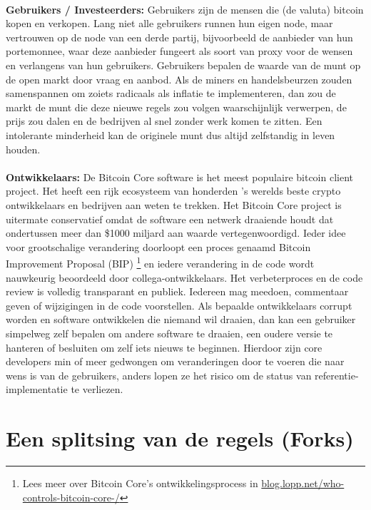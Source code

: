 \paragraph{}
\noindent\textbf{Gebruikers / Investeerders:} 
Gebruikers zijn de mensen die (de valuta) bitcoin kopen en verkopen. Lang niet alle gebruikers runnen hun eigen node, maar vertrouwen op de node van een derde partij, bijvoorbeeld de aanbieder van hun portemonnee, waar deze aanbieder fungeert als soort van proxy voor de wensen en verlangens van hun gebruikers. Gebruikers bepalen de waarde van de munt op de open markt door vraag en aanbod. Als de miners en handelsbeurzen zouden samenspannen om zoiets radicaals als inflatie te implementeren, dan zou de markt de munt die deze nieuwe regels zou volgen waarschijnlijk verwerpen, de prijs zou dalen en de bedrijven al snel zonder werk komen te zitten. Een intolerante minderheid kan de originele munt dus altijd zelfstandig in leven houden.

\paragraph{}
\noindent\textbf{Ontwikkelaars:}
De Bitcoin Core software is het meest populaire bitcoin client project. Het heeft een rijk ecosysteem van honderden 's werelds beste crypto ontwikkelaars en bedrijven aan weten te trekken. Het Bitcoin Core project is uitermate conservatief omdat de software een netwerk draaiende houdt dat ondertussen meer dan \$1000 miljard aan waarde vertegenwoordigd. Ieder idee voor grootschalige verandering doorloopt een proces genaamd Bitcoin Improvement Proposal (BIP) \footnote{Lees meer over Bitcoin Core's ontwikkelingsprocess in \href{https://blog.lopp.net/who-controls-bitcoin-core-/}{blog.lopp.net/who-controls-bitcoin-core-/}} en iedere verandering in de code wordt nauwkeurig beoordeeld door collega-ontwikkelaars. Het verbeterproces en de code review is volledig transparant en publiek. Iedereen mag meedoen, commentaar geven of wijzigingen in de code voorstellen. Als bepaalde ontwikkelaars corrupt worden en software ontwikkelen die niemand wil draaien, dan kan een gebruiker simpelweg zelf bepalen om andere software te draaien, een oudere versie te hanteren of besluiten om zelf iets nieuws te beginnen. Hierdoor zijn core developers min of meer gedwongen om veranderingen door te voeren die naar wens is van de gebruikers, anders lopen ze het risico om de status van referentie-implementatie te verliezen. 

\section{Een splitsing van de regels (Forks)}

